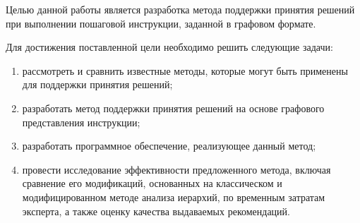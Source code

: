 Целью данной работы является разработка метода поддержки принятия решений при выполнении пошаговой инструкции, заданной в графовом формате.

Для достижения поставленной цели необходимо решить следующие задачи:
\begin{enumerate}
    \item рассмотреть и сравнить известные методы, которые могут быть применены для поддержки принятия решений;
    \item разработать метод поддержки принятия решений на основе графового представления инструкции;
    \item разработать программное обеспечение, реализующее данный метод;
    \item провести исследование эффективности предложенного метода, включая сравнение его модификаций, основанных на классическом и модифицированном методе анализа иерархий, по временным затратам эксперта, а также оценку качества выдаваемых рекомендаций.
\end{enumerate}